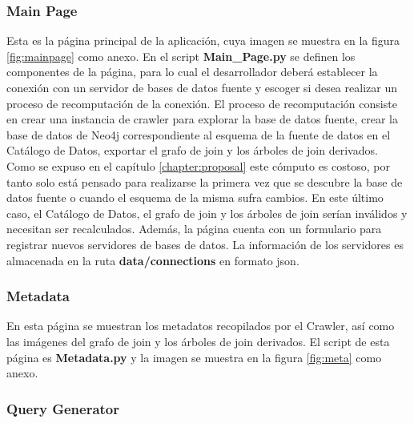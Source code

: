 \subsubsection{Main Page}

Esta es la página principal de la aplicación, cuya imagen se muestra en la figura \ref{fig:mainpage} como anexo. 
En el script \textbf{Main\_Page.py} se definen 
los componentes de la página, para lo cual el desarrollador deber\'a establecer la conexión con un servidor de 
bases de datos fuente y escoger si desea realizar un proceso de recomputaci\'on de la conexión. El 
proceso de recomputaci\'on consiste en crear una instancia de crawler para explorar la base de datos 
fuente, crear la base de datos de Neo4j correspondiente al esquema de la fuente de datos en el Catálogo 
de Datos, exportar el grafo de join y los \'arboles de join derivados. Como se expuso en el capítulo 
\ref{chapter:proposal} este cómputo es costoso, por tanto solo est\'a pensado para realizarse la primera 
vez que se descubre la base de datos fuente o cuando el esquema de la misma sufra cambios. En este \'ultimo caso, 
el Catálogo de Datos, el grafo de join y los \'arboles de join serían inválidos y necesitan ser recalculados. 
Además, la página cuenta con un formulario para registrar nuevos servidores de bases de datos. La información 
de los servidores es almacenada en la ruta \textbf{data/connections} en formato json.

\subsubsection{Metadata}

En esta página se muestran los metadatos recopilados por el Crawler, as\'i como las imágenes del 
grafo de join y los \'arboles de join derivados. El script de esta página es \textbf{Metadata.py} y 
la imagen se muestra en la figura \ref{fig:meta} como anexo.

\subsubsection{Query Generator}

